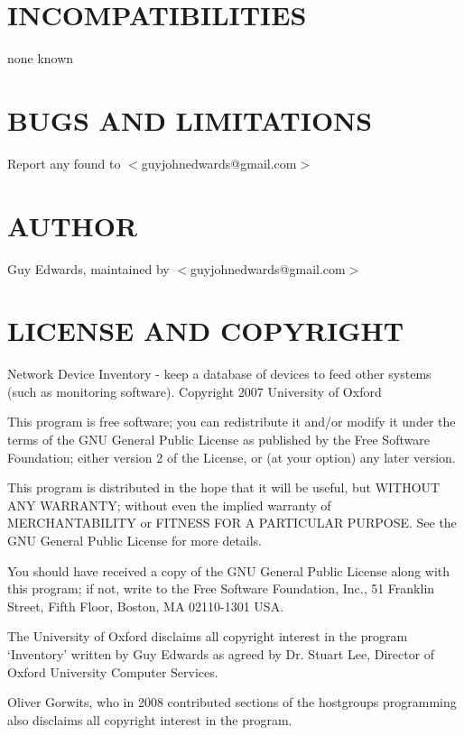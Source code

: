 \documentclass{book}
\begin{document}
\section{INCOMPATIBILITIES}
\label{_INCOMPATIBILITIES}
\hypertarget{_INCOMPATIBILITIES}{}



none known


\section{BUGS AND LIMITATIONS}
\label{_BUGS_AND_LIMITATIONS}
\hypertarget{_BUGS_AND_LIMITATIONS}{}



Report any found to $<$guyjohnedwards@gmail.com$>$


\section{AUTHOR}
\label{_AUTHOR}
\hypertarget{_AUTHOR}{}



Guy Edwards, maintained by $<$guyjohnedwards@gmail.com$>$


\section{LICENSE AND COPYRIGHT}
\label{_LICENSE_AND_COPYRIGHT}
\hypertarget{_LICENSE_AND_COPYRIGHT}{}



Network Device Inventory - keep a database of devices to feed other systems (such as monitoring software). Copyright 2007 University of Oxford



This program is free software; you can redistribute it and/or modify it under the terms of the GNU General Public License as published by the Free Software Foundation; either version 2 of the License, or (at your option) any later version.



This program is distributed in the hope that it will be useful, but WITHOUT ANY WARRANTY; without even the implied warranty of MERCHANTABILITY or FITNESS FOR A PARTICULAR PURPOSE. See the GNU General Public License for more details.



You should have received a copy of the GNU General Public License along with this program; if not, write to the Free Software Foundation, Inc., 51 Franklin Street, Fifth Floor, Boston, MA 02110-1301 USA.



The University of Oxford disclaims all copyright interest in the program `Inventory' written by Guy Edwards as agreed by Dr. Stuart Lee, Director of Oxford University Computer Services.



Oliver Gorwits, who in 2008 contributed sections of the hostgroups programming also disclaims all copyright interest in the program.

\cleardoublepage
{}
\printindex
\end{document}
